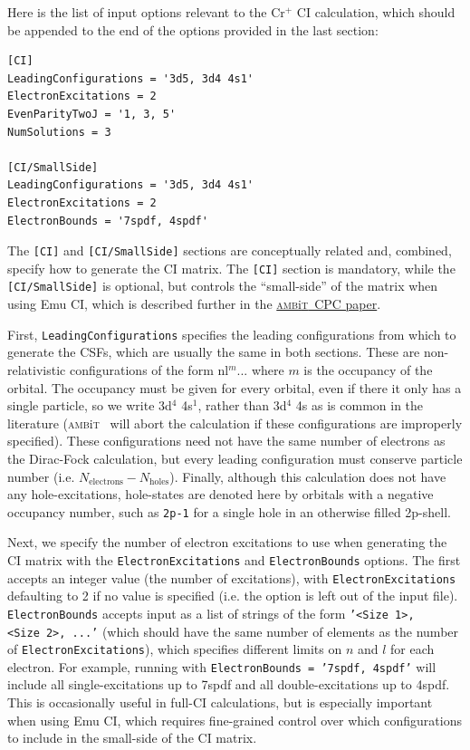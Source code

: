 \documentclass{report}
\newcommand{\ambit}{\textsc{amb}{\footnotesize i}\textsc{t}}
\begin{document}
Here is the list of input options relevant to the Cr$^+$ CI calculation, which should be appended to the
end of the options provided in the last section:

\begin{verbatim}
[CI]
LeadingConfigurations = '3d5, 3d4 4s1'                             
ElectronExcitations = 2
EvenParityTwoJ = '1, 3, 5'                                                     
NumSolutions = 3

[CI/SmallSide]                                                                 
LeadingConfigurations = '3d5, 3d4 4s1'
ElectronExcitations = 2
ElectronBounds = '7spdf, 4spdf'
\end{verbatim}

The \texttt{[CI]} and \texttt{[CI/SmallSide]} sections are conceptually related and, combined, specify 
how to generate the CI matrix. The \texttt{[CI]} section is mandatory, while the \texttt{[CI/SmallSide]}
is optional, but controls the ``small-side'' of the matrix when using Emu CI, which is described further
in the \href{link_goes_here}{\ambit\  CPC paper}.

First, \texttt{LeadingConfigurations} specifies the leading configurations from which to generate the 
CSFs, which are usually the
same in both sections. These are non-relativistic configurations of the form nl$^{m}...$ where $m$ is 
the occupancy of the orbital. The occupancy must be given for every orbital, even if there it only has a
single particle, so we write 3d$^4$ 4s$^1$, rather than 3d$^4$ 4s as is common in the literature (\ambit
~will abort the calculation if these configurations are improperly specified). These configurations need
not have the same number of electrons as the Dirac-Fock calculation, but every leading configuration
must conserve particle number (i.e. $N_{\mathrm{electrons}} - N_{\mathrm{holes}}$). Finally, although
this calculation does not have any hole-excitations, hole-states are denoted here by orbitals with a
negative occupancy number, such as \texttt{2p-1} for a single hole in an otherwise filled 2p-shell.

Next, we specify the number of electron excitations to use when generating the CI matrix with
the \texttt{ElectronExcitations} and \texttt{ElectronBounds} options. The first accepts
an integer value (the number of excitations), with \texttt{ElectronExcitations} defaulting to 2 if no value is specified (i.e. the option is left out of the
input file). \texttt{ElectronBounds} accepts input as a list of strings of the form 
\texttt{'<Size~1>, <Size~2>, ...'} (which should have the same number of elements as the number of \texttt{ElectronExcitations}), which specifies different limits on $n$ and $l$ for each 
electron. For example, running with \texttt{ElectronBounds = '7spdf, 4spdf'} will include all
single-excitations up to 7spdf and all double-excitations up to 4spdf. This is occasionally useful in
full-CI calculations, but is especially important when using Emu CI, which requires fine-grained control
over which configurations to include in the small-side of the CI matrix. 
\end{document}
